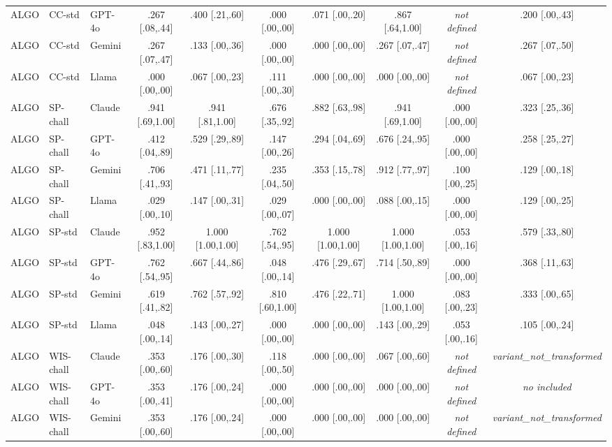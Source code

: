 \begin{table}[t]
\begin{tabular}{lllccccccc}
    ALGO & CC-std & GPT-4o     & .267 [.08,.44] & .400 [.21,.60] & .000 [.00,.00] & .071 [.00,.20] & .867 [.64,1.00] & \textit{not defined} & .200 [.00,.43] \\
    ALGO & CC-std & Gemini     & .267 [.07,.47] & .133 [.00,.36] & .000 [.00,.00] & .000 [.00,.00] & .267 [.07,.47] & \textit{not defined} & .267 [.07,.50] \\
    ALGO & CC-std & Llama      & .000 [.00,.00] & .067 [.00,.23] & .111 [.00,.30] & .000 [.00,.00] & .000 [.00,.00] & \textit{not defined} & .067 [.00,.23] \\
    ALGO & SP-chall & Claude     & .941 [.69,1.00] & .941 [.81,1.00] & .676 [.35,.92] & .882 [.63,.98] & .941 [.69,1.00] & .000 [.00,.00] & .323 [.25,.36] \\
    ALGO & SP-chall & GPT-4o     & .412 [.04,.89] & .529 [.29,.89] & .147 [.00,.26] & .294 [.04,.69] & .676 [.24,.95] & .000 [.00,.00] & .258 [.25,.27] \\
    ALGO & SP-chall & Gemini     & .706 [.41,.93] & .471 [.11,.77] & .235 [.04,.50] & .353 [.15,.78] & .912 [.77,.97] & .100 [.00,.25] & .129 [.00,.18] \\
    ALGO & SP-chall & Llama      & .029 [.00,.10] & .147 [.00,.31] & .029 [.00,.07] & .000 [.00,.00] & .088 [.00,.15] & .000 [.00,.00] & .129 [.00,.25] \\
    ALGO & SP-std & Claude     & .952 [.83,1.00] & 1.000 [1.00,1.00] & .762 [.54,.95] & 1.000 [1.00,1.00] & 1.000 [1.00,1.00] & .053 [.00,.16] & .579 [.33,.80] \\
    ALGO & SP-std & GPT-4o     & .762 [.54,.95] & .667 [.44,.86] & .048 [.00,.14] & .476 [.29,.67] & .714 [.50,.89] & .000 [.00,.00] & .368 [.11,.63] \\
    ALGO & SP-std & Gemini     & .619 [.41,.82] & .762 [.57,.92] & .810 [.60,1.00] & .476 [.22,.71] & 1.000 [1.00,1.00] & .083 [.00,.23] & .333 [.00,.65] \\
    ALGO & SP-std & Llama      & .048 [.00,.14] & .143 [.00,.27] & .000 [.00,.00] & .000 [.00,.00] & .143 [.00,.29] & .053 [.00,.16] & .105 [.00,.24] \\
    ALGO & WIS-chall & Claude     & .353 [.00,.60] & .176 [.00,.30] & .118 [.00,.50] & .000 [.00,.00] & .067 [.00,.60] & \textit{not defined} & \textit{variant\_not\_transformed} \\
    ALGO & WIS-chall & GPT-4o     & .353 [.00,.41] & .176 [.00,.24] & .000 [.00,.00] & .000 [.00,.00] & .000 [.00,.00] & \textit{not defined} & \textit{no included} \\
    ALGO & WIS-chall & Gemini     & .353 [.00,.60] & .176 [.00,.24] & .000 [.00,.00] & .000 [.00,.00] & .000 [.00,.00] & \textit{not defined} & \textit{variant\_not\_transformed} \\

\end{tabular}
\end{table}
